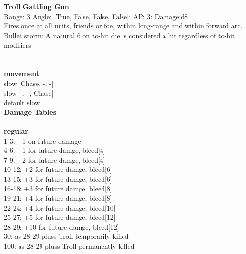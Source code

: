 \ \\

\ \\
{\bf Troll Gattling Gun } \\



Range: 3  Angle: [True, False, False, False]: AP: 3: Damage:d8 \\
Fires once at all units, friends or foe, within long-range and within forward arc.\\ 
Bullet storm: A natural 6 on to-hit die is considered a hit regardless of to-hit modifiers\\ 




 
\ \\



\ \\ {\bf movement } \\
slow [Chase, -, -] \\
slow [-, -, Chase] \\
default slow \\


{\bf Damage Tables} \\
\ \\ {\bf regular } \\
1-3: +1 on future damage \\
4-6: +1 for future damge, bleed[4] \\
7-9: +2 for future damge, bleed[4] \\
10-12: +2 for future damge, bleed[6] \\
13-15: +3 for future damge, bleed[6] \\
16-18: +3 for future damge, bleed[8] \\
19-21: +4 for future damge, bleed[8] \\
22-24: +4 for future damge, bleed[10] \\
25-27: +5 for future damge, bleed[12] \\
28-29: +10 for future damge, bleed[12] \\
30: as 28-29 pluss Troll temporarily killed \\
100: as 28-29 pluss Troll permanently killed \\










\pagebreak\pagebreak

